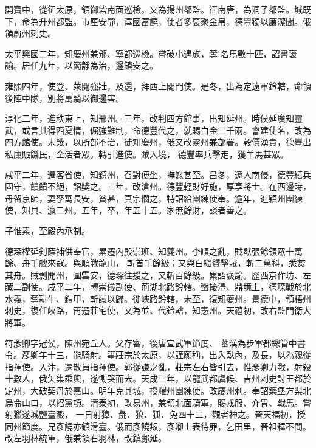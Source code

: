 \begin{pinyinscope}
 開寶中，從征太原，領御砦南面巡檢。又為揚州都監。征南唐，為洞子都監。城既下，命為升州都監。市厘安靜，澤國富饒，使者多裒聚金帛，德豐獨以廉潔聞。俄領蔚州刺史。



 太平興國二年，知慶州兼邠、寧都巡檢。嘗破小遇族，奪
 名馬數十匹，詔書褒諭。居任九年，以簡靜為治，邊鎮安之。



 雍熙四年，使登、萊閱強壯，及還，拜西上閣門使。是冬，出為定遠軍鈐轄，命領後陣中隊，別將萬騎以御邊害。



 淳化二年，進秩東上，知邢州。三年，改判四方館事，出知延州。時侯延廣知靈武，或言其得西夏情，倔強難制，命德豐代之，就賜白金三千兩。會建使名，改為四方館使。未幾，以所部不治，徙知慶州，俄又改靈州兼部署。穀價湧貴，德豐出私廩賑饑民，全活者眾。轉引進使。賊入境，
 德豐率兵擊走，獲羊馬甚眾。



 咸平二年，遷客省使，知鎮州，召對便坐，撫慰甚至。昌冬，遼人南侵，德豐繕兵固守，饋饋不絕，詔獎之。三年，改滄州。德豐輕財好施，厚享將士。在西邊時，母留京師，妻孥寓長安，貧甚，真宗憫之，特詔給團練使奉。逾年，進穎州團練使，知貝、瀛二州。五年，卒，年五十五。家無餘財，談者善之。



 子惟素，至殿內承制。



 德琛權延釗蔭補供奉官，累遷內殿崇班、知夔州。李順之亂，賊猷張餘領眾十萬餘、舟千艘來寇。與順戰龍山，
 斬首千餘級；又與白繼贇擊賊，斬二萬科，悉焚其舟。賊剽開州，圍雲安，德琛往援之，又斬百餘級。累詔褒諭。歷西京作坊、左藏二副使。咸平二年，轉崇儀副使、荊湖北路鈐轄。蠻擾澧、鼎境上，德琛戰於北水義，奪耕牛、鎧甲，斬馘以歸。徙峽路鈐轄，未至，復知夔州。景德中，領梧州刺史，復任峽路，再遷莊宅使，又為並、代鈐轄，知憲州。天禧初，改右監門衛大將軍。



 符彥卿字冠侯，陳州宛丘人。父存審，後唐宣武軍節度、
 蕃漢為步軍都總管中書令。彥卿年十三，能騎射。事莊宗於太原，以謹願稱，出入臥內，及長，以為親從指揮使。入汴，遷散員指揮使。郭從謙之亂，莊宗左右皆引去，惟彥卿力戰，射殺十數人，俄矢集乘輿，遂慟哭而去。天成三年，以龍武都虞候、吉州刺史討王都於定州，大破契丹於嘉山。明年克其城，授耀州團練使。改慶州刺。奉詔築堡方渠北烏侖山口，以招黨項。清泰初，改易州，兼領北面騎軍，賜戎服、介冑、戰馬。嘗射獵遂城鹽臺澱，
 一日射獐、彘、狼、狐、兔四十二，觀者神之。晉天福初，授同州節度。兄彥饒亦鎮滑臺。俄而彥饒叛，彥卿上表待罪，乞田里，晉祖釋不問。改左羽林統軍，俄兼領右羽林，改鎮鄜延。




\end{pinyinscope}
